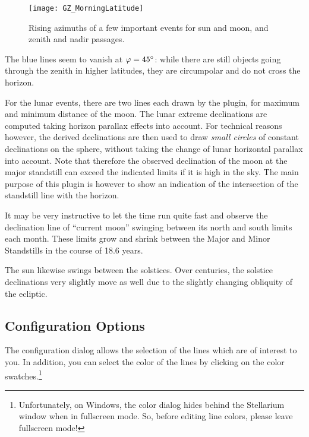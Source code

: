 \begin{figure}[t]
\texttt{[image: GZ\_MorningLatitude]}
\caption{Rising azimuths of a few important events for sun and moon, and zenith and nadir passages.}
\label{fig:plugin:ArchaeoLines:MorningLatitudes}
\end{figure}

The blue lines seem to vanish at $\varphi=45\degree$: while there are
still objects going through the zenith in higher latitudes, they are
circumpolar and do not cross the horizon.

For the lunar events, there are two lines each drawn by the plugin,
for maximum and minimum distance of the moon.  The lunar extreme
declinations are computed taking horizon parallax effects into
account. For technical reasons however, the derived declinations are
then used to draw \emph{small circles} of constant declinations on the
sphere, without taking the change of lunar horizontal parallax into
account.  Note that therefore the observed declination of the moon at
the major standstill can exceed the indicated limits if it is high in
the sky. The main purpose of this plugin is however to show an
indication of the intersection of the standstill line with the
horizon.

It may be very instructive to let the time run quite fast and observe
the declination line of ``current moon'' swinging between its north
and south limits each month.  These limits grow and shrink between the
Major and Minor Standstills in the course of 18.6 years.

The sun likewise swings between the solstices. Over centuries, the
solstice declinations very slightly move as well due to the slightly
changing obliquity of the ecliptic.


\subsection{Configuration Options}
\label{sec:plugin:ArchaeoLines:configuration}

The configuration dialog allows the selection of the lines which are
of interest to you. 
%
%
In addition, you can select the color of the lines by clicking on the
color swatches.\footnote{Unfortunately, on Windows, the color dialog hides
behind the Stellarium window when in fullscreen mode. So, before
editing line colors, please leave fullscreen mode!}

